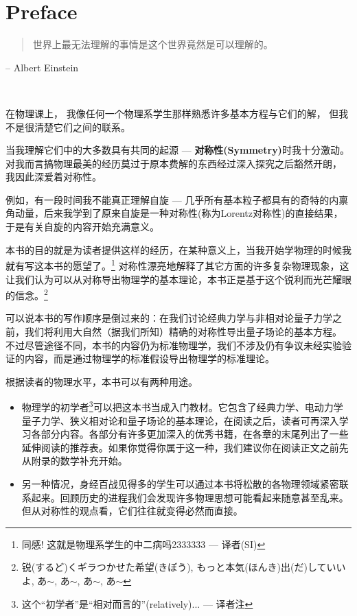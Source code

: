 
\chapter*{Preface}

\begin{quote}
世界上最无法理解的事情是这个世界竟然是可以理解的。
\end{quote}
\begin{flushright}
-- Albert Einstein
\end{flushright}


\ 

在物理课上， 我像任何一个物理系学生那样熟悉许多基本方程与它们的解， 但我不是很清楚它们之间的联系。

当我理解它们中的大多数具有共同的起源 --- \textbf{对称性(Symmetry)}时我十分激动。 对我而言搞物理最美的经历莫过于原本费解的东西经过深入探究之后豁然开朗， 我因此深爱着对称性。

例如，有一段时间我不能真正理解自旋 --- 几乎所有基本粒子都具有的奇特的内禀角动量，后来我学到了原来自旋是一种对称性(称为Lorentz对称性)的直接结果，于是有关自旋的内容开始充满意义。

本书的目的就是为读者提供这样的经历，在某种意义上，当我开始学物理的时候我就有写这本书的愿望了。\footnote{同感! 这就是物理系学生的中二病吗2333333 --- 译者(SI)} 对称性漂亮地解释了其它方面的许多复杂物理现象，这让我们认为可以从对称导出物理学的基本理论，本书正是基于这个锐利而光芒耀眼的信念。\footnote{锐(するど)くギラつかせた希望(きぼう), もっと本気(ほんき)出(だ)していいよ, あ$\sim$, あ$\sim$, あ$\sim$, あ$\sim$}

可以说本书的写作顺序是倒过来的：在我们讨论经典力学与非相对论量子力学之前，我们将利用大自然（据我们所知）精确的对称性导出量子场论的基本方程。 不过尽管途径不同，本书的内容仍为标准物理学，我们不涉及仍有争议未经实验验证的内容，而是通过物理学的标准假设导出物理学的标准理论。

根据读者的物理水平，本书可以有两种用途。
\begin{itemize}
	\item 物理学的初学者\footnote{这个“初学者”是“相对而言的”(relatively)... --- 译者注}可以把这本书当成入门教材。它包含了经典力学、电动力学量子力学、狭义相对论和量子场论的基本理论，在阅读之后，读者可再深入学习各部分内容。各部分有许多更加深入的优秀书籍，在各章的末尾列出了一些延伸阅读的推荐表。如果你觉得你属于这一种，我们建议你在阅读正文之前先从附录的数学补充开始。
	\item 
	另一种情况，身经百战见得多的学生可以通过本书将松散的各物理领域紧密联系起来。回顾历史的进程我们会发现许多物理思想可能看起来随意甚至乱来。但从对称性的观点看，它们往往就变得必然而直接。
\end{itemize}

